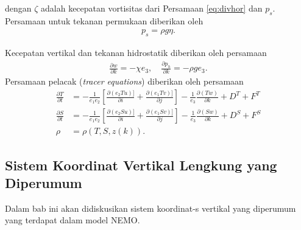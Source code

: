 \begin{spacing}{1.5}
	dengan $\zeta$ adalah kecepatan vortisitas dari Persamaan \ref{eq:divhor} dan $p_s$. Persamaan untuk tekanan permukaan diberikan oleh
	\begin{equation*}
		\begin{aligned}
			p_s=\rho g \eta.
		\end{aligned}
	\end{equation*}
	
	Kecepatan vertikal dan tekanan hidrostatik diberikan oleh persamaan
	\begin{equation*}
		\begin{aligned}
			\frac{\partial w}{\partial k}=-\chi e_3, \quad \frac{\partial p_h}{\partial k}=-\rho ge_3.
		\end{aligned}
	\end{equation*}
	Persamaan pelacak (\textit{tracer equations}) diberikan oleh persamaan
	\begin{equation*}
		\begin{aligned}
			\frac{\partial T}{\partial t} &=-\frac{1}{e_1e_2}\left[\frac{\partial (e_2Tu)]}{\partial i}+\frac{\partial (e_1Tv)]}{\partial j}\right]-\frac{1}{e_3}\frac{\partial (Tw)}{\partial k}+D^T+F^T \\
			\frac{\partial S}{\partial t} &=-\frac{1}{e_1e_2}\left[\frac{\partial (e_2Su)]}{\partial i}+\frac{\partial (e_1Sv)]}{\partial j}\right]-\frac{1}{e_3}\frac{\partial (Sw)}{\partial k}+D^S+F^S \\			
			\rho &= \rho(T,S,z(k)).
		\end{aligned}
	\end{equation*}
\subsection[Sistem Koordinat-s Vertikal Lengkung yang Diperumum]{Sistem Koordinat Vertikal Lengkung yang Diperumum}	
	Dalam bab ini akan didiskusikan sistem koordinat-s vertikal yang diperumum yang terdapat dalam model NEMO.
	

\end{spacing}
